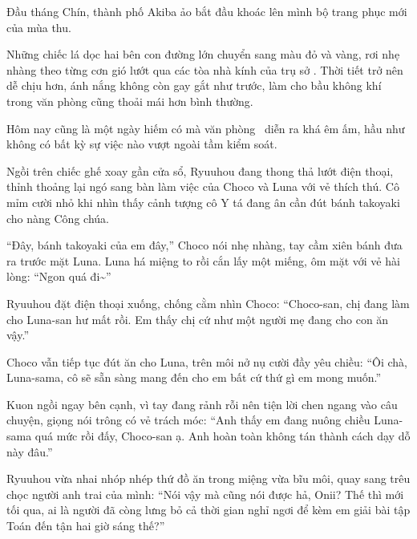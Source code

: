 \documentclass[../main.tex]{subfiles}
\begin{document}

Đầu tháng Chín, thành phố Akiba ảo bắt đầu khoác lên mình bộ trang phục mới của mùa thu.

Những chiếc lá dọc hai bên con đường lớn chuyển sang màu đỏ và vàng, rơi nhẹ nhàng theo từng cơn gió lướt qua các tòa nhà kính của trụ sở \hll. Thời tiết trở nên dễ chịu hơn, ánh nắng không còn gay gắt như trước, làm cho bầu không khí trong văn phòng cũng thoải mái hơn bình thường.

Hôm nay cũng là một ngày hiếm có mà văn phòng \hll\ diễn ra khá êm ấm, hầu như không có bất kỳ sự việc nào vượt ngoài tầm kiểm soát.

Ngồi trên chiếc ghế xoay gần cửa sổ, Ryuuhou đang thong thả lướt điện thoại, thỉnh thoảng lại ngó sang bàn làm việc của Choco và Luna với vẻ thích thú. Cô mỉm cười nhỏ khi nhìn thấy cảnh tượng cô Y tá đang ân cần đút bánh takoyaki cho nàng Công chúa.

``Đây, bánh takoyaki của em đây,'' Choco nói nhẹ nhàng, tay cầm xiên bánh đưa ra trước mặt Luna. Luna há miệng to rồi cắn lấy một miếng, ôm mặt với vẻ hài lòng: ``Ngon quá đi\~{}''


Ryuuhou đặt điện thoại xuống, chống cằm nhìn Choco: ``Choco-san, chị đang làm cho Luna-san hư mất rồi. Em thấy chị cứ như một người mẹ đang cho con ăn vậy.''

Choco vẫn tiếp tục đút ăn cho Luna, trên môi nở nụ cười đầy yêu chiều: ``Ôi chà, Luna-sama, cô sẽ sẵn sàng mang đến cho em bất cứ thứ gì em mong muốn.''

Kuon ngồi ngay bên cạnh, vì tay đang rảnh rỗi nên tiện lời chen ngang vào câu chuyện, giọng nói trông có vẻ trách móc: ``Anh thấy em đang nuông chiều Luna-sama quá mức rồi đấy, Choco-san ạ. Anh hoàn toàn không tán thành cách dạy dỗ này đâu.''

Ryuuhou vừa nhai nhóp nhép thứ đồ ăn trong miệng vừa bĩu môi, quay sang trêu chọc người anh trai của mình: ``Nói vậy mà cũng nói được hả, Onii? Thế thì mới tối qua, ai là người đã còng lưng bỏ cả thời gian nghỉ ngơi để kèm em giải bài tập Toán đến tận hai giờ sáng thế?''
\end{document}
